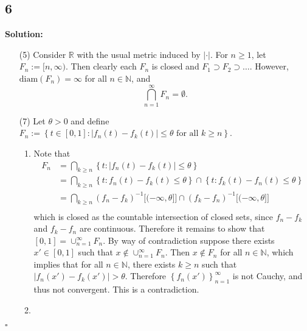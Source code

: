 \documentclass[12pt]{article}
\newcounter{ProofCounter}
\newenvironment{Solution}{\stepcounter{ProofCounter}\textbf{Solution:}}{\hfill$\square$}
\begin{document}
\newpage
\subsection*{6}
\begin{Solution}
  \begin{enumerate}
    \item[(5)] Consider $\mathbb{R}$ with the usual metric induced by $|\cdot|$. For $n\geq 1$, let $F_n := [n, \infty)$. Then clearly each $F_n$ is
      closed and $F_1 \supset F_2 \supset \dots$. However, $\text{diam}(F_n) = \infty$ for all $n \in \mathbb{N}$, and 
      \[
        \bigcap_{n=1}^{\infty}F_{n} = \emptyset.
      \]

    \item[(7)] Let $\theta > 0$ and define $F_n := \left\{ t \in [0,1]: |f_n(t) - f_k(t)| \leq \theta \text{ for all } k \geq n \right\}$.
      \begin{enumerate}
        \item Note that 
          \begin{align*}
            F_n & = \bigcap_{k\geq n}\left\{ t : |f_n(t) - f_k(t)| \leq \theta \right\}\\
            & = \bigcap_{k\geq n}\left\{ t : f_n(t) - f_k(t)\leq \theta \right\} \cap \left\{ t : f_k(t) - f_n(t) \leq \theta \right\}\\
            & = \bigcap_{k\geq n}(f_n - f_k)^{-1}\big[(-\infty,\theta]\big] \cap  (f_k - f_n)^{-1}\big[(-\infty,\theta]\big] \\
          \end{align*}
          which is closed as the countable intersection of closed sets, since $f_n - f_k$ and $f_k - f_n$ are continuous. Therefore it remains to show
          that $[0,1] = \cup_{n=1}^{\infty}F_n$. By way of contradiction suppose there exists $x' \in [0,1]$ such that $x \notin
          \cup_{n=1}^{\infty}F_n$. Then $x \notin F_n$ for all $n \in \mathbb{N}$, which implies that for all $n \in \mathbb{N}$, there exists $k \geq
          n$ such that $|f_n(x') - f_k(x')| > \theta$. Therefore $\left\{ f_n(x') \right\}_{n=1}^{\infty}$ is not Cauchy, and thus not convergent.
          This is a contradiction.

        \item
      \end{enumerate}
  \end{enumerate}
\end{Solution}
\end{document}
